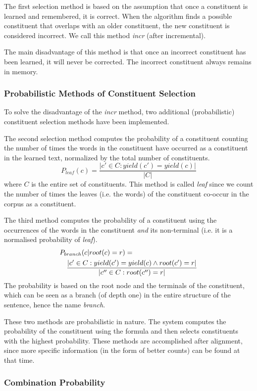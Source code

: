 \documentclass[letterpaper,mlapa]{article}
\begin{document}
The first selection method is based on the assumption that once a constituent
is learned and remembered, it is correct. When the algorithm finds a possible
constituent that overlaps with an older constituent, the new constituent is
considered incorrect. We call this method \emph{incr} (after incremental).

The main disadvantage of this method is that once an incorrect constituent has
been learned, it will never be corrected. The incorrect constituent always
remains in memory.


\subsubsection{Probabilistic Methods of Constituent Selection}

To solve the disadvantage of the \emph{incr} method, two additional
(probabilistic) constituent selection methods have been implemented.

The second selection method computes the probability of a constituent counting
the number of times the words in the constituent have occurred as a constituent
in the learned text, normalized by the total number of constituents.
\[P_{leaf}(c)=\frac{|c'\in C:yield(c')=yield(c)|}{|C|}\] where $C$ is the
entire set of constituents. This method is called \emph{leaf} since we count
the number of times the leaves (i.e. the words) of the constituent co-occur in
the corpus as a constituent.

The third method computes the probability of a constituent using the
occurrences of the words in the constituent \emph{and} its non-terminal (i.e.
it is a normalised probability of \emph{leaf}).
\begin{eqnarray*}
\lefteqn{P_{branch}(c|root(c)=r)=}\\
& &\frac{|c'\in C:yield(c')=yield(c)\wedge root(c')=r|}{|c''\in C:root(c'')=r|}
\end{eqnarray*}
The probability is based on the root node and the terminals of the constituent,
which can be seen as a branch (of depth one) in the entire structure of the
sentence, hence the name \emph{branch}.
 
These two methods are probabilistic in nature. The system computes the
probability of the constituent using the formula and then selects constituents
with the highest probability. These methods are accomplished after alignment,
since more specific information (in the form of better counts) can be found at
that time.


\subsubsection{Combination Probability}
\end{document}
